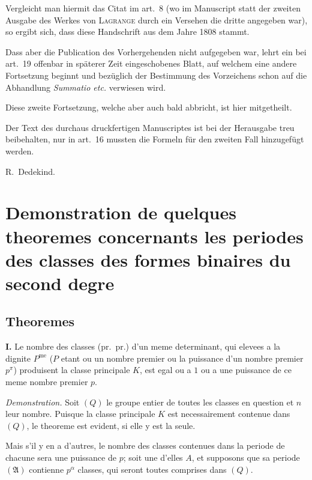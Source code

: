 \documentclass[12pt,a4paper]{article}
\begin{document}
Vergleicht man hiermit das Citat im art.\ 8 (wo im Manuscript statt der zweiten Ausgabe des Werkes von \textsc{Lagrange} durch ein Versehen die dritte angegeben war), so ergibt sich, dass diese Handschrift aus dem Jahre 1808 stammt.

Dass aber die Publication des Vorhergehenden nicht aufgegeben war, lehrt ein bei art.\ 19 offenbar in sp\"aterer Zeit eingeschobenes Blatt, auf welchem eine andere Fortsetzung beginnt und bez\"uglich der Bestimmung des Vorzeichens schon auf die Abhandlung \textit{Summatio etc.} verwiesen wird.

Diese zweite Fortsetzung, welche aber auch bald abbricht, ist hier mitgetheilt.

Der Text des durchaus druckfertigen Manuscriptes ist bei der Herausgabe treu beibehalten, nur in art.\ 16 mussten die Formeln f\"ur den zweiten Fall hinzugef\"ugt werden.

\begin{flushright}
R.~Dedekind.
\end{flushright}


\section*{Demonstration de quelques theoremes concernants les periodes des classes des formes binaires du second degre}

\subsection*{Theoremes}

\textbf{I.} Le nombre des classes (pr.\ pr.) d'un meme determinant, qui elevees a la dignite $P^\text{me}$ ($P$ etant ou un nombre premier ou la puissance d'un nombre premier $p^\pi$) produisent la classe principale $K$, est egal ou a $1$ ou a une puissance de ce meme nombre premier $p$.

\textit{Demonstration.} Soit $(Q)$ le groupe entier de toutes les classes en question et $n$ leur nombre. Puisque la classe principale $K$ est necessairement contenue dans $(Q)$, le theoreme est evident, si elle y est la seule.

Mais s'il y en a d'autres, le nombre des classes contenues dans la periode de chacune sera une puissance de $p$; soit une d'elles $A$, et supposons que sa periode $(\mathfrak{A})$ contienne $p^\alpha$ classes, qui seront toutes comprises dans $(Q)$.
\end{document}

